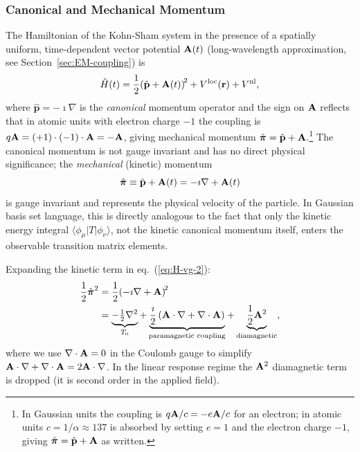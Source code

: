 \subsubsection{Canonical and Mechanical Momentum}
\label{sec:canon-mech}

The Hamiltonian of the Kohn-Sham system in the presence of a
spatially uniform, time-dependent vector potential $\mathbf{A}(t)$
(long-wavelength approximation, see Section~\ref{sec:EM-coupling})
is
\begin{equation}
  \hat{H}(t) = \frac{1}{2}
    \!\left(\hat{\mathbf{p}} + \mathbf{A}(t)\right)^{\!2}
    + V^{\mathrm{loc}}(\mathbf{r}) + V^{\mathrm{nl}},
  \label{eq:H-vg-2}
\end{equation}
where $\hat{\mathbf{p}} = -\imath\nabla$ is the \emph{canonical}
momentum operator and the sign on $\mathbf{A}$ reflects that in atomic
units with electron charge $-1$ the coupling is
$q\mathbf{A} = (+1)\cdot(-1)\cdot\mathbf{A} = -\mathbf{A}$, giving mechanical
momentum $\hat{\boldsymbol{\pi}} = \hat{\mathbf{p}} + \mathbf{A}$.\footnote{In
Gaussian units the coupling is $q\mathbf{A}/c = -e\mathbf{A}/c$ for an
electron; in atomic units $c=1/\alpha\approx137$ is absorbed by
setting $e=1$ and the electron charge $-1$, giving
$\hat{\boldsymbol{\pi}} = \hat{\mathbf{p}} + \mathbf{A}$ as written.}
The canonical momentum is not gauge invariant and has no direct
physical significance;\cite{Sakurai-2nd_ed} the
\emph{mechanical} (kinetic) momentum
\begin{equation}
  \hat{\boldsymbol{\pi}} \equiv \hat{\mathbf{p}} + \mathbf{A}(t) = -\imath\nabla + \mathbf{A}(t)
  \label{eq:pi-mech}
\end{equation}
is gauge invariant and represents the physical velocity of the
particle.\cite{Sakurai-2nd_ed,starace-1971}
In Gaussian basis set language, this is directly analogous to the
fact that only the kinetic energy integral $\langle\phi_\mu|T|
\phi_\nu\rangle$, not the kinetic canonical momentum itself, enters
the observable transition matrix elements.

Expanding the kinetic term in eq.~(\ref{eq:H-vg-2}):
\begin{align}
  \frac{1}{2}\hat{\boldsymbol{\pi}}^2
  &= \frac{1}{2}
     \!\left(-\imath\nabla + \mathbf{A}\right)^{\!2}
  \nonumber \\
  &= \underbrace{-\tfrac{1}{2}\nabla^2}_{T_0}
   + \underbrace{\frac{\imath}{2}
     \left(\mathbf{A}\cdot\nabla + \nabla\cdot\mathbf{A}\right)
     }_{\text{paramagnetic coupling}}
   + \underbrace{\frac{1}{2}\mathbf{A}^2}_{\text{diamagnetic}},
  \label{eq:kinetic-expand}
\end{align}
where we use $\nabla\cdot\mathbf{A} = 0$ in the Coulomb gauge to
simplify $\mathbf{A}\cdot\nabla + \nabla\cdot\mathbf{A} = 2\mathbf{A}\cdot\nabla$.
In the linear response regime the $\mathbf{A}^2$ diamagnetic term is
dropped (it is second order in the applied field).

